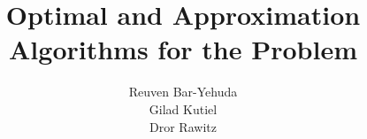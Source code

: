 \title{
	Optimal and Approximation Algorithms for the \ca{}{} Problem
}

\author{
	Reuven Bar-Yehuda \\
	Gilad Kutiel \\
	Dror Rawitz
}



